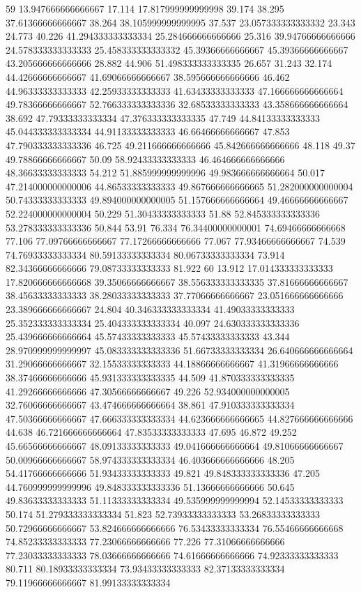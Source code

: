 59 13.947666666666667 17.114 17.817999999999998 39.174 38.295 37.61366666666667 38.264 38.105999999999995 37.537 23.057333333333332 23.343 24.773 40.226 41.294333333333334 25.284666666666666 25.316 39.94766666666666 24.578333333333333 25.458333333333332 45.39366666666667 45.39366666666667 43.205666666666666 28.882 44.906 51.498333333333335 26.657 31.243 32.174 44.42666666666667 41.69066666666667 38.595666666666666 46.462 44.96333333333333 42.25933333333333 41.63433333333333 47.166666666666664 49.78366666666667 52.766333333333336 32.68533333333333 43.358666666666664 38.692 47.79333333333334 47.376333333333335 47.749 44.84133333333333 45.044333333333334 44.91133333333333 46.66466666666667 47.853 47.790333333333336 46.725 49.211666666666666 45.842666666666666 48.118 49.37 49.78866666666667 50.09 58.92433333333333 46.464666666666666 48.36633333333333 54.212 51.885999999999996 49.983666666666664 50.017 47.214000000000006 44.86533333333333 49.867666666666665 51.282000000000004 50.74333333333333 49.894000000000005 51.157666666666664 49.46666666666667 52.224000000000004 50.229 51.30433333333333 51.88 52.845333333333336 53.278333333333336 50.844 53.91 76.334 76.34400000000001 74.69466666666668 77.106 77.09766666666667 77.17266666666666 77.067 77.93466666666667 74.539 74.76933333333334 80.59133333333334 80.06733333333334 73.914 82.34366666666666 79.08733333333333 81.922
60 13.912 17.014333333333333 17.820666666666668 39.35066666666667 38.556333333333335 37.81666666666667 38.45633333333333 38.28033333333333 37.77066666666667 23.051666666666666 23.389666666666667 24.804 40.346333333333334 41.49033333333333 25.352333333333334 25.404333333333334 40.097 24.630333333333336 25.439666666666664 45.57433333333333 45.57433333333333 43.344 28.970999999999997 45.083333333333336 51.66733333333334 26.640666666666664 31.29066666666667 32.15533333333333 44.18866666666667 41.31966666666666 38.37466666666666 45.931333333333335 44.509 41.870333333333335 41.29266666666666 47.30566666666667 49.226 52.934000000000005 32.76066666666667 43.474666666666664 38.861 47.910333333333334 47.50366666666667 47.666333333333334 44.623666666666665 44.827666666666666 44.638 46.721666666666664 47.83533333333333 47.695 46.872 49.252 45.66566666666667 48.09133333333333 49.041666666666664 49.81066666666667 50.00966666666667 58.974333333333334 46.403666666666666 48.205 54.41766666666666 51.93433333333333 49.821 49.848333333333336 47.205 44.760999999999996 49.848333333333336 51.13666666666666 50.645 49.83633333333333 51.11333333333334 49.535999999999994 52.14533333333333 50.174 51.279333333333334 51.823 52.73933333333333 53.26833333333333 50.72966666666667 53.824666666666666 76.53433333333334 76.55466666666668 74.85233333333333 77.23066666666666 77.226 77.31066666666666 77.23033333333333 78.03666666666666 74.61666666666666 74.92333333333333 80.711 80.18933333333334 73.93433333333333 82.37133333333334 79.11966666666667 81.99133333333334
